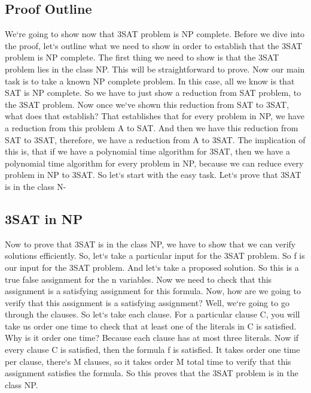 \subsection{Proof Outline}
We`re going to show now that 3SAT problem is NP complete.
Before we dive into the proof, let`s outline what we need to show in order to establish that the 3SAT problem is NP complete.
The first thing we need to show is that the 3SAT problem lies in the class NP\@.
This will be straightforward to prove.
Now our main task is to take a known NP complete problem.
In this case, all we know is that SAT is NP complete.
So we have to just show a reduction from SAT problem, to the 3SAT problem.
Now once we`ve shown this reduction from SAT to 3SAT, what does that establish? That establishes that for every problem in NP, we have a reduction from this problem A to SAT\@.
And then we have this reduction from SAT to 3SAT, therefore, we have a reduction from A to 3SAT\@.
The implication of this is, that if we have a polynomial time algorithm for 3SAT, then we have a polynomial time algorithm for every problem in NP, because we can reduce every problem in NP to 3SAT\@.
So let`s start with the easy task.
Let`s prove that 3SAT is in the class N-

\subsection{3SAT in NP}
Now to prove that 3SAT is in the class NP, we have to show that we can verify solutions efficiently.
So, let`s take a particular input for the 3SAT problem.
So f is our input for the 3SAT problem.
And let`s take a proposed solution.
So this is a true false assignment for the n variables.
Now we need to check that this assignment is a satisfying assignment for this formula.
Now, how are we going to verify that this assignment is a satisfying assignment? Well, we`re going to go through the clauses.
So let`s take each clause.
For a particular clause C, you will take us order one time to check that at least one of the literals in C is satisfied.
Why is it order one time? Because each clause has at most three literals.
Now if every clause C is satisfied, then the formula f is satisfied.
It takes order one time per clause, there`s M clauses, so it takes order M total time to verify that this assignment satisfies the formula.
So this proves that the 3SAT problem is in the class NP\@.

